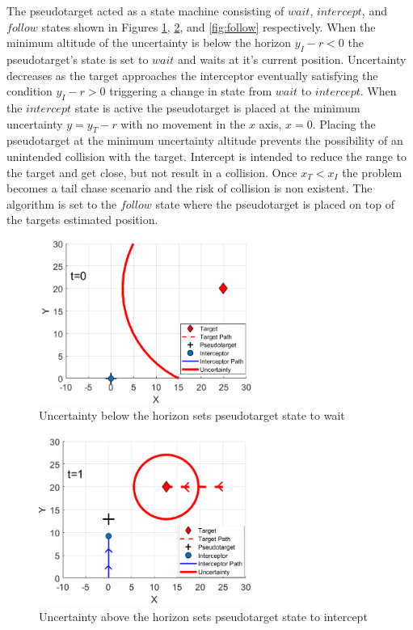 \documentclass[conference]{IEEEtran}
\begin{document}
The pseudotarget acted as a state machine consisting of $wait$, $intercept$, and $follow$ states shown in Figures \ref{fig:wait}, \ref{fig:intercept}, and \ref{fig:follow} respectively. When the minimum altitude of the uncertainty is below the horizon $y_I-r<0$ the pseudotarget's state is set to $wait$ and waits at it's current position. Uncertainty decreases as the target approaches the interceptor eventually satisfying the condition $y_I-r >0$ triggering a change in state from $wait$ to $intercept$. When the $intercept$ state is active the pseudotarget is placed at the minimum uncertainty $y=y_T-r$ with no movement in the $x$ axis, $x=0$. Placing the pseudotarget at the minimum uncertainty altitude prevents the possibility of an unintended collision with the target. Intercept is intended to reduce the range to the target and get close, but not result in a collision. Once $x_T<x_I$ the problem becomes a tail chase scenario and the risk of collision is non existent. The algorithm is set to the $follow$ state where the pseudotarget is placed on top of the targets estimated position. 



\begin{figure}[H]
	\centering
	\includegraphics[width=7cm]{wait}
	\caption{Uncertainty below the horizon sets pseudotarget state to wait}
	\label{fig:wait}
\end{figure}

\begin{figure}[H]
	\centering
	\includegraphics[width=7cm]{intercept}
	\caption{Uncertainty above the horizon sets pseudotarget state to intercept}
	\label{fig:intercept}
\end{figure}
\end{document}
